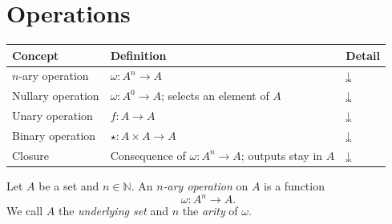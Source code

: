 
\section{Operations}

\begin{tcolorbox}[colback=gray!6, colframe=gray!40, arc=2pt,
  left=6pt, right=6pt, top=4pt, bottom=4pt,
  title={\small\textbf{Operations — Quick Reference}},
  fonttitle=\small\bfseries]
\small
\begin{tabular}{l l l}
\toprule
\textbf{Concept} & \textbf{Definition} & \textbf{Detail} \\
\midrule
$n$-ary operation  & $\omega : A^n \to A$                           & \hyperref[def:nary-op]{↓} \\
Nullary operation  & $\omega : A^0 \to A$; selects an element of $A$         & \hyperref[def:nullary-op]{↓} \\
Unary operation    & $f : A \to A$                                  & \hyperref[def:unary-op]{↓} \\
Binary operation   & $\star : A \times A \to A$                     & \hyperref[def:binary-op]{↓} \\
Closure            & Consequence of $\omega : A^n \to A$; outputs stay in $A$ & \hyperref[def:binary-op]{↓} \\
\bottomrule
\end{tabular}
\end{tcolorbox}

\vspace{1em}


\begin{tcolorbox}[colback=propbox, colframe=propborder, arc=2pt,
  left=6pt, right=6pt, top=4pt, bottom=4pt,
  title={\small\textbf{Definition ($n$-ary Operation)}},
  fonttitle=\small\bfseries]
\label{def:nary-op}
Let $A$ be a set and $n \in \mathbb{N}$.
An \emph{$n$-ary operation} on $A$ is a function
\[
  \omega : A^n \to A.
\]
We call $A$ the \emph{underlying set} and $n$ the \emph{arity} of $\omega$.
\end{tcolorbox}

